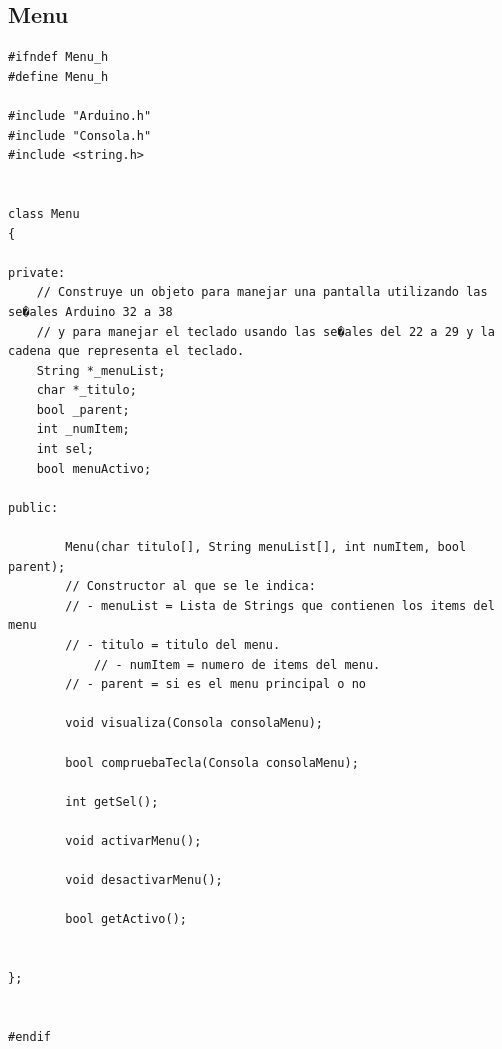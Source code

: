 \documentclass[11pt,twoside]{book}
\begin{document}
\subsection{Menu}
\begin{lstlisting}
#ifndef Menu_h
#define Menu_h

#include "Arduino.h"
#include "Consola.h"
#include <string.h>


class Menu
{

private:
	// Construye un objeto para manejar una pantalla utilizando las se�ales Arduino 32 a 38
	// y para manejar el teclado usando las se�ales del 22 a 29 y la cadena que representa el teclado.
	String *_menuList;
	char *_titulo;
	bool _parent;
	int _numItem;
	int sel;
	bool menuActivo;

public:

	    Menu(char titulo[], String menuList[], int numItem, bool parent);
	    // Constructor al que se le indica:
	    // - menuList = Lista de Strings que contienen los items del menu
	    // - titulo = titulo del menu.
			// - numItem = numero de items del menu.
	    // - parent = si es el menu principal o no

	    void visualiza(Consola consolaMenu);

	    bool compruebaTecla(Consola consolaMenu);

	    int getSel();

	    void activarMenu();

	    void desactivarMenu();

	    bool getActivo();


};


#endif

\end{lstlisting}
\end{document}
